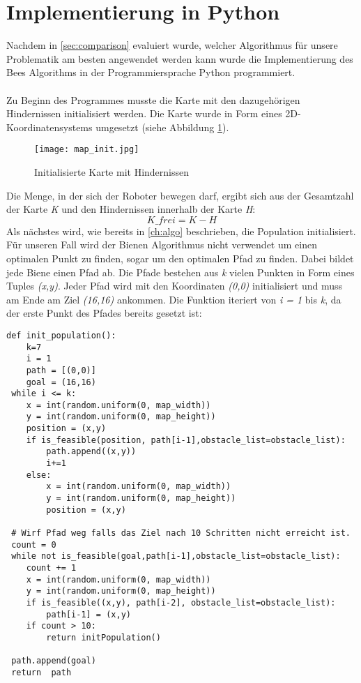 \section{Implementierung in Python}
Nachdem in \autoref{sec:comparison} evaluiert wurde, welcher Algorithmus für unsere Problematik am besten angewendet werden kann wurde die Implementierung des \glqq Bees Algorithms\grqq{} in der Programmiersprache Python programmiert.\\\\
Zu Beginn des Programmes musste die Karte mit den dazugehörigen Hindernissen initialisiert werden. Die Karte wurde in Form eines 2D-Koordinatensystems umgesetzt (siehe Abbildung \ref{fig:map_init}).

\begin{figure}[h]
    \centering
    \texttt{[image: map\_init.jpg]}
    \caption{Initialisierte Karte mit Hindernissen\\}   
    \label{fig:map_init}
\end{figure}

Die Menge, in der sich der Roboter bewegen darf, ergibt sich aus der Gesamtzahl der Karte \emph{K} und den Hindernissen innerhalb der Karte \emph{H}:
\[K\_frei = K - H\]
Als nächstes wird, wie bereits in \autoref{ch:algo} beschrieben, die Population initialisiert. Für unseren Fall wird der Bienen Algorithmus nicht verwendet um einen optimalen Punkt zu finden, sogar um den optimalen Pfad zu finden. Dabei bildet jede Biene einen Pfad ab. Die Pfade bestehen aus \emph{k} vielen Punkten in Form eines Tuples \emph{(x,y)}. Jeder Pfad wird mit den Koordinaten \emph{(0,0)} initialisiert und muss am Ende am Ziel \emph{(16,16)} ankommen. Die Funktion iteriert von \emph{i = 1} bis \emph{k}, da der erste Punkt des Pfades bereits gesetzt ist:

\begin{verbatim}
def init_population():
    k=7
    i = 1
    path = [(0,0)]
    goal = (16,16)
 while i <= k:
    x = int(random.uniform(0, map_width))
    y = int(random.uniform(0, map_height))
    position = (x,y)
    if is_feasible(position, path[i-1],obstacle_list=obstacle_list):
        path.append((x,y))
        i+=1
    else: 
        x = int(random.uniform(0, map_width))
        y = int(random.uniform(0, map_height))
        position = (x,y)
            
 # Wirf Pfad weg falls das Ziel nach 10 Schritten nicht erreicht ist.
 count = 0
 while not is_feasible(goal,path[i-1],obstacle_list=obstacle_list):
    count += 1
    x = int(random.uniform(0, map_width))
    y = int(random.uniform(0, map_height))
    if is_feasible((x,y), path[i-2], obstacle_list=obstacle_list):
        path[i-1] = (x,y)
    if count > 10:
        return initPopulation()   
    
 path.append(goal)
 return  path
\end{verbatim}
\vspace*{-3mm}
\vspace*{3mm}


